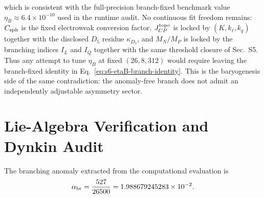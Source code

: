 \documentclass[11pt]{article}
\begin{document}
which is consistent with the full-precision branch-fixed benchmark value
$\eta_B\approx6.4\times10^{-10}$ used in the runtime audit. No continuous fit
freedom remains: $C_{\rm sph}$ is the fixed electroweak conversion factor,
$J_{CP}^{\rm topo}$ is locked by $(K,k_{\ell},k_q)$ together with the disclosed
$D_5$ residue $\kappa_{D_5}$, and $M_N/M_P$ is locked by the branching indices
$I_L$ and $I_Q$ together with the same threshold closure of Sec.~S5. Thus any
attempt to tune $\eta_B$ at fixed $(26,8,312)$ would require leaving the
branch-fixed identity in Eq.~\eqref{eq:s6-etaB-branch-identity}. This is the
baryogenesis side of the same contradiction: the anomaly-free branch does not
admit an independently adjustable asymmetry sector.

\section{Lie-Algebra Verification and Dynkin Audit}

The branching anomaly extracted from the computational evaluation is
\begin{equation}
 \alpha_{\rm br}=\frac{527}{26500}=1.988679245283\times10^{-2}.
\end{equation}
\end{document}
